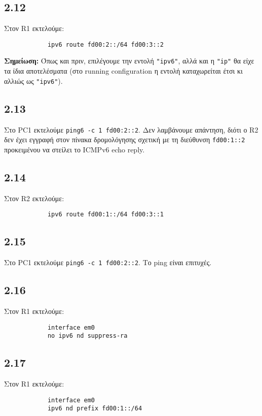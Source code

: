 \documentclass[a4paper, 12pt]{article}
\begin{document}
	\subsection*{2.12}
		Στον R1 εκτελούμε:
		
		\begin{verbatim}
			ipv6 route fd00:2::/64 fd00:3::2
		\end{verbatim}
		
		\textbf{Σημείωση:} Όπως και πριν, επιλέγουμε την εντολή \verb|"ipv6"|, αλλά και η \verb|"ip"| θα είχε τα ίδια αποτελέσματα (στο running configuration η εντολή καταχωρείται έτσι κι αλλιώς ως \verb|"ipv6"|).

	\subsection*{2.13}
		Στο PC1 εκτελούμε \verb|ping6 -c 1 fd00:2::2|. Δεν λαμβάνουμε απάντηση, διότι ο R2 δεν έχει εγγραφή στον πίνακα δρομολόγησης σχετική με τη διεύθυνση \verb|fd00:1::2| προκειμένου να στείλει το ICMPv6 echo reply.

	\subsection*{2.14}
		Στον R2 εκτελούμε:
		
		\begin{verbatim}
			ipv6 route fd00:1::/64 fd00:3::1 
		\end{verbatim} 

	\subsection*{2.15}
		Στο PC1 εκτελούμε \verb|ping6 -c 1 fd00:2::2|. Το ping είναι επιτυχές.

	\subsection*{2.16}
		Στον R1 εκτελούμε:
		
		\begin{verbatim}
			interface em0
			no ipv6 nd suppress-ra
		\end{verbatim}

	\subsection*{2.17}
		Στον R1 εκτελούμε:
		
		\begin{verbatim}
			interface em0
			ipv6 nd prefix fd00:1::/64
		\end{verbatim}
\end{document}
